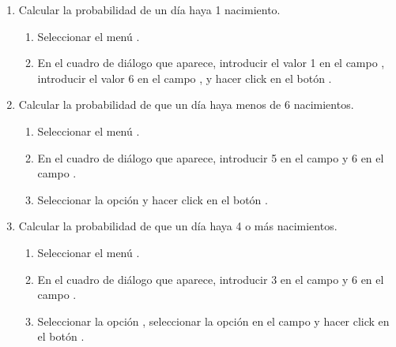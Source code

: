 \begin{enumerate}[leftmargin=*]
\begin{enumerate}
\item Calcular la probabilidad de un día haya 1 nacimiento.
\begin{indicacion}
\begin{enumerate}
\item Seleccionar el menú .
\item En el cuadro de diálogo que aparece, introducir el valor 1 en el campo , introducir
el valor 6 en el campo , y hacer click en el botón .
\end{enumerate}
\end{indicacion}

\item Calcular la probabilidad de que un día haya menos de 6 nacimientos.
\begin{indicacion}
\begin{enumerate}
\item Seleccionar el menú .
\item En el cuadro de diálogo que aparece, introducir 5 en el campo  y 6 en el campo
.
\item Seleccionar la opción  y hacer click en el botón .
\end{enumerate}
\end{indicacion}

\item Calcular la probabilidad de que un día haya 4 o más nacimientos. 
\begin{indicacion}
\begin{enumerate}
\item Seleccionar el menú .
\item En el cuadro de diálogo que aparece, introducir 3 en el campo  y 6 en el campo
. 
\item Seleccionar la opción , seleccionar la opción  en el campo
 y hacer click en el botón .
\end{enumerate}
\end{indicacion}


\end{enumerate}
\end{enumerate}
